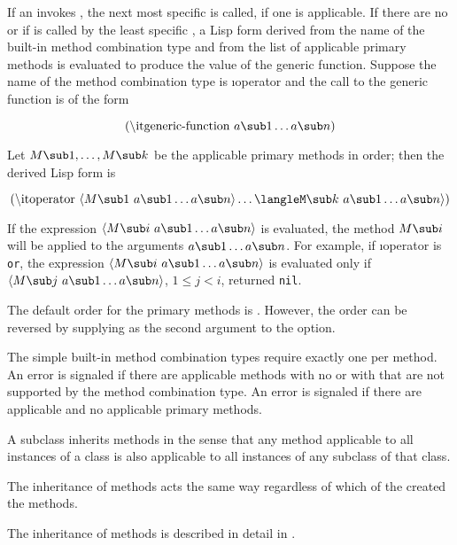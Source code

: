 \itemitem{\bull} If an  invokes ,
the next most specific  is
called, if one is applicable.  If there are no 
or if  is called by the least specific
, a Lisp form derived from the name of the built-in
method combination type and from the list of applicable primary
methods is evaluated to produce the value of the generic function.
Suppose the name of the method combination type is \i{operator}
and the call to the generic function is of the form

$$(\hbox{\i{generic-function}}\ a\sub 1\ldots a\sub n)$$

\itemitem{} Let $M\sub 1,\ldots,M\sub k$ be the applicable primary methods
in order; then the derived Lisp form is

$$(\hbox{\i{operator}}\ \langle M\sub  1%
\ a\sub 1\ldots a\sub n\rangle\ldots\langle%
M\sub k\ a\sub 1\ldots a\sub n\rangle)$$

\itemitem{} If the expression $\langle M\sub i \ a\sub 1\ldots a\sub
n\rangle$ is
evaluated, the method $M\sub i$ will be applied to the arguments
$a\sub 1\ldots a\sub n$.  
For example,
if \i{operator} is {\tt or},
the expression $\langle M\sub i \ a\sub 1\ldots a\sub n\rangle$ is
evaluated only if $\langle M\sub j \ a\sub 1\ldots a\sub n\rangle$,
$1\leq j<i$, returned {\tt nil}.
                                                      
\itemitem{} The default order for the primary methods is 
.  However, the order can be reversed by supplying
 as the second argument to the  option.
\endlist

The simple built-in method combination types require exactly one
 per method.  An error is signaled if there are applicable
methods with no  or with  that are not supported
by the method combination type. An error is signaled if there are
applicable  and no applicable primary
methods.

\endsubsubsection%

\endSubsection%


A subclass inherits methods in the sense that any method applicable to
all instances of a class is also applicable to all instances of any
subclass of that class.

The inheritance of methods acts the same way regardless of 
which of the  created the methods.

The inheritance of methods is described in detail in 
\secref\MethodSelectionAndCombination.

\endSubsection%
